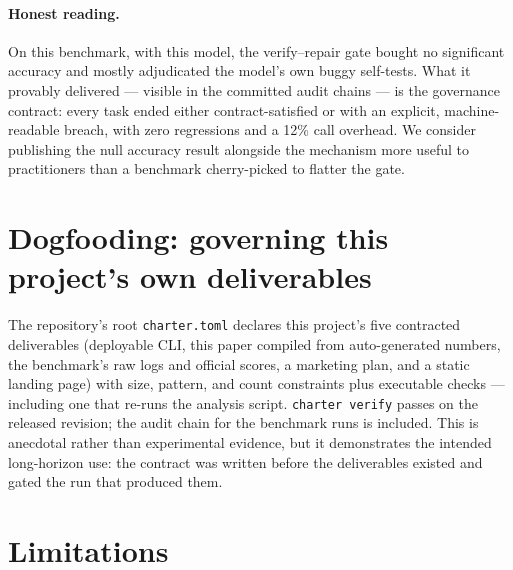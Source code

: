 \documentclass{article}
\begin{document}
\paragraph{Honest reading.} On this benchmark, with this model, the verify--repair
gate bought no significant accuracy and mostly adjudicated the model's own buggy
self-tests. What it provably delivered --- visible in the committed audit chains ---
is the governance contract: every task ended either contract-satisfied or with an
explicit, machine-readable breach, with zero regressions and a 12\% call overhead.
We consider publishing the null accuracy result alongside the mechanism more useful
to practitioners than a benchmark cherry-picked to flatter the gate.

\section{Dogfooding: governing this project's own deliverables}
The repository's root \texttt{charter.toml} declares this project's five contracted
deliverables (deployable CLI, this paper compiled from auto-generated numbers, the
benchmark's raw logs and official scores, a marketing plan, and a static landing
page) with size, pattern, and count constraints plus executable checks --- including
one that re-runs the analysis script. \texttt{charter verify} passes on the released
revision; the audit chain for the benchmark runs is included. This is anecdotal
rather than experimental evidence, but it demonstrates the intended long-horizon use:
the contract was written before the deliverables existed and gated the run that
produced them.

\section{Limitations}
\label{sec:limitations}
\end{document}
